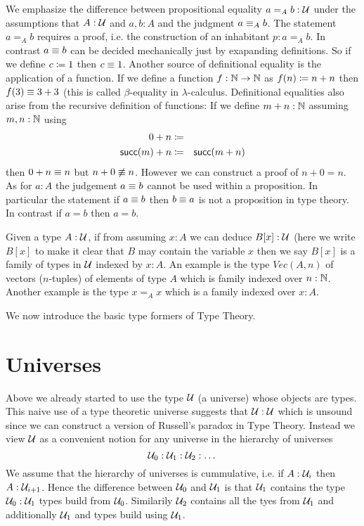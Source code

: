 We emphasize the difference between propositional equality $a =_A b : {\mathcal U}$ under the assumptions
that $A:{\mathcal U}$ and $a,b : A$ and the judgment $a \equiv_A b$. The
statement $a =_A b$ requires a proof, i.e. the construction of an
inhabitant $p : a =_A b$. In contrast $a \equiv b$ can be
decided mechanically just by exapanding definitions. So if we define 
$c \coloneqq 1$ then $c\equiv 1$. Another source of definitional equality
is the application of a function. If we define a function $f : \mathbb{N} \to
\mathbb{N}$ as $f(n) \coloneqq n + n$ then $f(3) \equiv 3+3$ (this is called
$\beta$-equality in $\lambda$-calculus. Definitional equalities also
arise from the recursive definition of functions: If we define $m + n
: \mathbb{N}$ assuming $m,n : \mathbb{N}$ using
\begin{eqnarray*}
  0 + n & \coloneqq & \\
  \mathsf{succ}(m) + n & \coloneqq & \mathsf{succ}(m + n)
\end{eqnarray*}
then $0 + n \equiv n$ but $n + 0 \not\equiv n$. However we can construct
a proof of $n + 0 = n$. As for $a : A$ the judgement $a \equiv b$
cannot be used within a proposition. In particular the statement if $a
\equiv b$ then $b \equiv a$ is not a proposition in type theory. In
contrast if $a = b$ then $a = b$.

Given a type $A:{\mathcal U}$, if from assuming $x:A$ we can deduce $B[x]:{\mathcal U}$ 
(here we write $B[x]$ to make it clear that $B$ may contain the
variable $x$ then we say $B[x]$ is a
family of types in ${\mathcal U}$ indexed by $x:A$. An example is the type $Vec(A,n)$ of
vectors ($n$-tuples) of elements of type $A$ which is family indexed
over $n : \mathbb{N}$. Another example is the type $x =_A x$ which is a
family indexed over $x : A$.

We now introduce the basic type formers of Type Theory.

\section{Universes}
\label{sec:universes}

Above we already started to use the type ${\mathcal U}$ (a universe) whose objects are
types. This naive use of a type theoretic universe suggests that ${\mathcal U}
: {\mathcal U}$ which is unsound since we can construct a version of Russell's
paradox in Type Theory. Instead we view ${\mathcal U}$ as a convenient notion
for any universe in the hierarchy of universes 
\[ {\mathcal U}_0 : {\mathcal U}_1 : {\mathcal U}_2 : \dots \]
We assume that the hierarchy of universes is cummulative, i.e. if
$A:{\mathcal U}_i$ then $A : {\mathcal U}_{i+1}$. Hence the difference between
${\mathcal U}_0$ and ${\mathcal U}_1$ is that ${\mathcal U}_1$ contains the type ${\mathcal U}_0:{\mathcal U}_1$
types build from ${\mathcal U}_0$. Similarily ${\mathcal U}_2$ contains all the tyes
from ${\mathcal U}_1$ and additionally ${\mathcal U}_1$ and types build using ${\mathcal U}_1$. 

